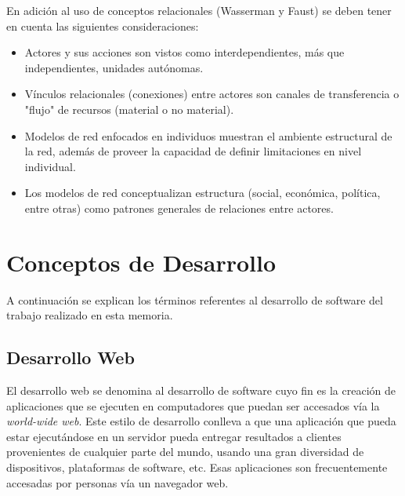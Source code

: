 En adición al uso de conceptos relacionales (Wasserman y Faust\cite{sna}) se deben tener en cuenta las siguientes consideraciones:

  \begin{itemize}
    \item Actores y sus acciones son vistos como interdependientes, más que independientes, unidades autónomas.
    \item Vínculos relacionales (conexiones) entre actores son canales de transferencia o "flujo" de recursos (material o no material).
    \item Modelos de red enfocados en individuos muestran el ambiente estructural de la red, además de proveer la capacidad de definir limitaciones en nivel individual.
    \item Los modelos de red conceptualizan estructura (social, económica, política, entre otras) como patrones generales de relaciones entre actores.
  \end{itemize}


% 
% 
% 


\section{Conceptos de Desarrollo} %
\label{sec:conceptos_de_desarrollo}

A continuación se explican los términos referentes al desarrollo de software del trabajo realizado en esta memoria.

\subsection{Desarrollo Web} %
\label{sub:desarrollo_web}


El desarrollo web se denomina al desarrollo de software cuyo fin es la creación de aplicaciones que se ejecuten en computadores que puedan ser accesados vía la \emph{world-wide web}. Este estilo de desarrollo conlleva a que una aplicación que pueda estar ejecutándose en un servidor pueda entregar resultados a clientes provenientes de cualquier parte del mundo, usando una gran diversidad de dispositivos, plataformas de software, etc. Esas aplicaciones son frecuentemente accesadas por personas vía un navegador web.\\

